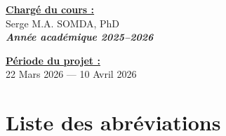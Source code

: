 \documentclass[
12pt,          %
a4paper,       %
oneside,       %
openright      %
]{report}
\begin{document}
\begin{titlepage}
	\vspace{0.4cm}
	
	\noindent
	\begin{minipage}[t]{0.48\textwidth}
		{\small
			\textbf{\underline{Chargé du cours :}}\\[5pt]
			Serge M.A. SOMDA, PhD\\
			{\color{couleurGris}\itshape
				\textbf{Année académique 2025--2026}
			}
		}
	\end{minipage}
	\hfill
	\begin{minipage}[t]{0.48\textwidth}
		\raggedleft
		{\small
			\textbf{\underline{Période du projet :}}\\[5pt]
			22 Mars 2026 --- 10 Avril 2026
		}
	\end{minipage}
	
	\vfill
	

				
			
	
\end{titlepage}
	
	
	\tableofcontents
	\newpage
	
	
	\chapter*{Liste des abr\'eviations}
	
\end{document}
